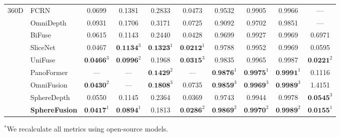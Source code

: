 \begin{table*} [ht]
\begin{center}
{\begin{tabular}{l|lcccc|ccc|c}
			\multirow{9}{*}{360D}
			& FCRN \cite{laina2016deeper} & 0.0699 & 0.1381 & 0.2833 & 0.0473 & 0.9532 & 0.9905 & 0.9966 & --- \\
			& OmniDepth \cite{zioulis2018omnidepth} & 0.0931 & 0.1706 & 0.3171 & 0.0725 & 0.9092 & 0.9702 & 0.9851 & --- \\
			& BiFuse \cite{wang2020bifuse}  & 0.0615 & 0.1143 & 0.2440 & 0.0428 & 0.9699 & 0.9927 & 0.9969 & 0.6971\\ 
			& SliceNet \cite{pintore2021slicenet} & 0.0467 & $\textbf{0.1134}^3$ & $\textbf{0.1323}^1$ & $\textbf{0.0212}^1$ & 0.9788 & 0.9952 & 0.9969& 0.0595 \\
			& UniFuse \cite{jiang2021unifuse} & $\textbf{0.0466}^3$ & $\textbf{0.0996}^2$ & 0.1968 & $\textbf{0.0315}^3$ & 0.9835 & 0.9965 & 0.9987 & $\textbf{0.0221}^2$    \\
			& PanoFormer \cite{shen2022panoformer} & --- & --- & $\textbf{0.1429}^2$ & --- & $\textbf{0.9876}^1$ & $\textbf{0.9975}^1$ & $\textbf{0.9991}^1$ & 0.1116   \\
			& OmniFusion \cite{li2022omnifusion} & $\textbf{0.0430}^2$ & --- & $\textbf{0.1808}^3$ & 0.0735 & $\textbf{0.9859}^3$ & $\textbf{0.9969}^3$ & $\textbf{0.9989}^3$ & 1.4151   \\
			& SphereDepth \cite{yan2022spheredepth} & 0.0550 & 0.1145 & 0.2364 & 0.0369 & 0.9743 & 0.9944 & 0.9978 & $\textbf{0.0545}^3$ \\
			& \textbf{SphereFusion} & $\textbf{0.0417}^1$ & $\textbf{0.0894}^1$ & 0.1813 & $\textbf{0.0286}^2$ & $\textbf{0.9869}^2$ & $\textbf{0.9970}^2$ & $\textbf{0.9989}^2$ & $\textbf{0.0155}^1$  \\
			
			\hline
			
		\end{tabular}}
	\end{center}
	\scriptsize{$^*$We recalculate all metrics using open-source models.}

    \vspace{-2.0em}
 
\end{table*}



